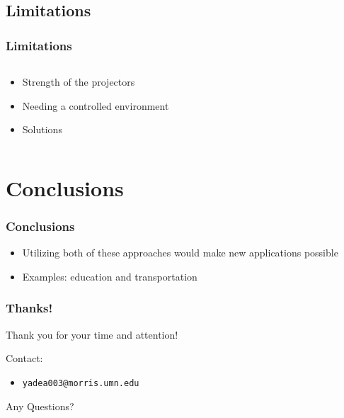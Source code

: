 \documentclass{beamer}
\newcommand{\linespace}{\vskip 0.25cm}
\begin{document}
\subsection{Limitations}
\begin{frame}	
\frametitle{Limitations}
    \begin{columns}
    \begin{column}{.8\textwidth}
	\begin{itemize}
		\item Strength of the projectors 
		\item Needing a controlled environment 
		\item Solutions
	\end{itemize}
	\end{column}
	\end{columns}
\end{frame}

\section[Conclusions]{Conclusions}
\begin{frame}
\frametitle{Conclusions}
	\begin{itemize}
		\item Utilizing both of these approaches would make new applications possible
		\item Examples: education and transportation

	\end{itemize}
\end{frame}

\begin{frame}
	\frametitle{Thanks!}
	
	Thank you for your time and attention!
		
	\linespace
	\linespace
	
	Contact:  
	\begin{itemize}
		\item \texttt{yadea003@morris.umn.edu}
	\end{itemize}
	
	\linespace
	\linespace
	
	\begin{center}
	{\huge Any Questions?}
	\end{center}
\end{frame}
\end{document}
